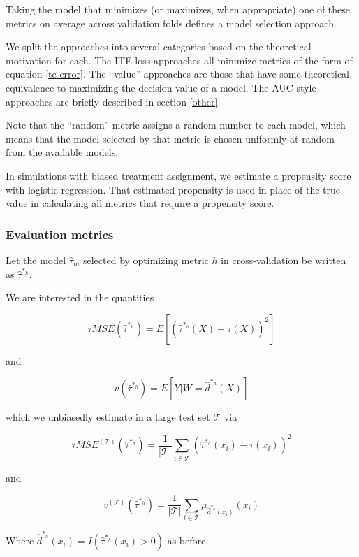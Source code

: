 Taking the model that minimizes (or maximizes, when appropriate) one of these metrics on average across validation folds defines a model selection approach. 

We split the approaches into several categories based on the theoretical motivation for each. The ITE loss approaches all minimize metrics of the form of equation \ref{te-error}. The ``value'' approaches are those that have some theoretical equivalence to maximizing the decision value of a model. The AUC-style approaches are briefly described in section \ref{other}. 

Note that the ``random'' metric assigns a random number to each model, which means that the model selected by that metric is chosen uniformly at random from the available models. 

In simulations with biased treatment assignment, we estimate a propensity score with logistic regression. That estimated propensity is used in place of the true value in calculating all metrics that require a propensity score.

\subsubsection{Evaluation metrics}

Let the model $\hat\tau_m$ selected by optimizing metric $h$ in cross-validation be written as $\hat\tau^{*_h}$. 

We are interested in the quantities

\[
\tau MSE(\hat\tau^{*_h}) = E[ (\hat\tau^{*_h} (X) - \tau(X))^2 ]
\]

and 

\[
v(\hat\tau^{*_h}) = E[ Y| W =\hat d^{*_h} (X)]
\]

which we unbiasedly estimate in a large test set $\mathcal{T}$ via

\begin{equation}
\label{true-mse}
\tau MSE^{(\mathcal{T})}(\hat\tau^{*_h}) = \frac{1}{|\mathcal{T}|}\sum_{i \in \mathcal{T}} (\hat\tau^{*_h} (x_i) - \tau(x_i))^2
\end{equation}

and 

\begin{equation}
\label{true-value}
v^{(\mathcal{T})}(\hat\tau^{*_h}) = \frac{1}{|\mathcal{T}|}\sum_{i \in \mathcal{T}} \mu_{\hat d^{*_h}(x_i)}(x_i)
\end{equation}

Where $\hat d^{*_h}(x_i) = I(\hat\tau^{*_h}(x_i) > 0)$ as before. 


